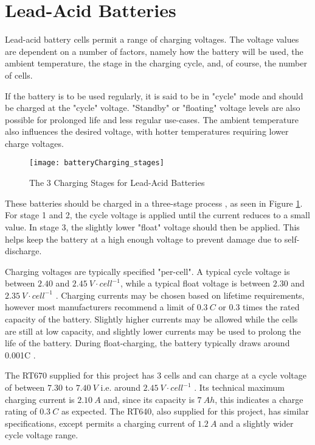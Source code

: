 \graphicspath{{content/1_literatureReview/figures/}}
\section{Lead-Acid Batteries}

Lead-acid battery cells permit a range of charging voltages. The voltage values are dependent on a number of factors, namely how the battery will be used,
the ambient temperature, the stage in the charging cycle, and, of course, the number of cells.

If the battery is to be used regularly, it is said to be in "cycle" mode and should be charged at the "cycle" voltage. "Standby" or "floating" voltage levels
are also possible for prolonged life and less regular use-cases. The ambient temperature also influences the desired voltage, with hotter temperatures
requiring lower charge voltages.

\begin{figure}[!htb]
  \centering
  \texttt{[image: batteryCharging\_stages]}
  \caption{The 3 Charging Stages for Lead-Acid Batteries}
  \label{fig:batteryCharging_stages}
\end{figure}

\noindent
These batteries should be charged in a three-stage process \cite{leadAcidCharging}, as seen in Figure \ref{fig:batteryCharging_stages}.
For stage 1 and 2, the cycle voltage is applied until the current reduces to a small value. In stage 3, the slightly lower "float" voltage should then be applied.
This helps keep the battery at a high enough voltage to prevent damage due to self-discharge.

Charging voltages are typically specified "per-cell". A typical cycle voltage is between $2.40$ and $\SI{2.45}{V \cdot cell^{-1}}$, while a typical float voltage is
between $2.30$ and $\SI{2.35}{V \cdot cell^{-1}}$ \cite{leadAcidCharging}. Charging currents may be chosen based on lifetime requirements, however most manufacturers
recommend a limit of $\SI{0.3}{C}$ or 0.3 times the rated capacity of the battery. Slightly higher currents may be allowed while the cells are still at low capacity,
and slightly lower currents may be used to prolong the life of the battery. During float-charging, the battery typically draws around 0.001C \cite{leadAcidCharging2}.

The RT670 supplied for this project has 3 cells and can charge at a cycle voltage of between $7.30$ to $\SI{7.40}{V}$ i.e. around $\SI{2.45}{V \cdot cell^{-1}}$ \cite{datasheetBattery}.
Its technical maximum charging current is $\SI{2.10}{A}$ and, since its capacity is $\SI{7}{Ah}$, this indicates a charge rating of $\SI{0.3}{C}$ as expected. The RT640, also supplied for this
project, has similar specifications, except permits a charging current of $\SI{1.2}{A}$ and a slightly wider cycle voltage range.